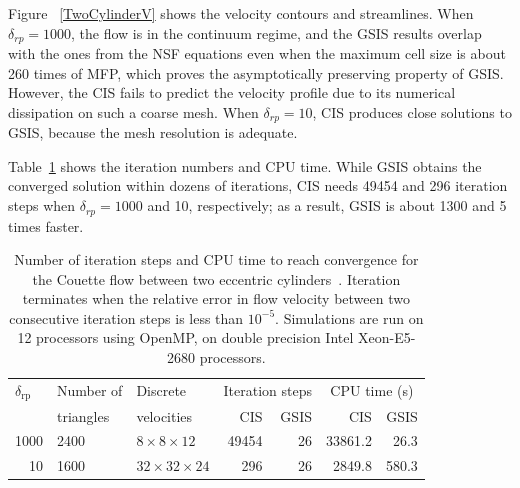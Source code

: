 Figure ~\ref{TwoCylinderV} shows the velocity contours and streamlines. When $\delta_{rp}=1000$, the flow is in the continuum regime, and the GSIS results overlap with the ones from the NSF equations even when the maximum cell size is about 260 times of MFP, which proves the asymptotically preserving property of GSIS.  However, the CIS fails to predict the velocity profile  due to its numerical dissipation on such a coarse mesh. When $\delta_{rp}=10$, CIS produces close solutions to GSIS,  because the mesh resolution is adequate. 

Table~\ref{tab:iteration2} shows the iteration numbers and CPU time. While GSIS obtains the converged solution within dozens of iterations, CIS needs 49454 and 296 iteration steps when $\delta_{rp}=1000$ and 10, respectively; as a result, GSIS is about 1300 and 5 times faster.





\begin{table}[t]
	\centering
	\caption{Number of iteration steps and CPU time to reach convergence for the Couette flow between two eccentric cylinders~\cite{SuArXiv2019}. Iteration terminates when the relative error in flow velocity  between two consecutive iteration steps is less than $10^{-5}$. Simulations are run on 12 processors using OpenMP, on double precision Intel Xeon-E5-2680 processors. }
	\begin{tabular}{rllrrrr}
		\hline
		\multicolumn{1}{l}{$\delta_\text{rp}$} & Number of & Discrete    & \multicolumn{2}{c}{Iteration steps} & \multicolumn{2}{c}{CPU time (s)} \\ 
		&  triangles   &   velocities    & \multicolumn{1}{r}{CIS} & \multicolumn{1}{r}{GSIS} & \multicolumn{1}{r}{CIS} & \multicolumn{1}{r}{GSIS}\\ 
		\hline
		1000   & 2400 & $8\times8\times 12$ & 49454    & 26    &     33861.2  & 26.3 \\
		10  & 1600 & $32\times32\times 24 $& 296    & 26    &   2849.8    & 580.3 \\ 
		\hline
	\end{tabular}%
	\label{tab:iteration2}%
\end{table}


